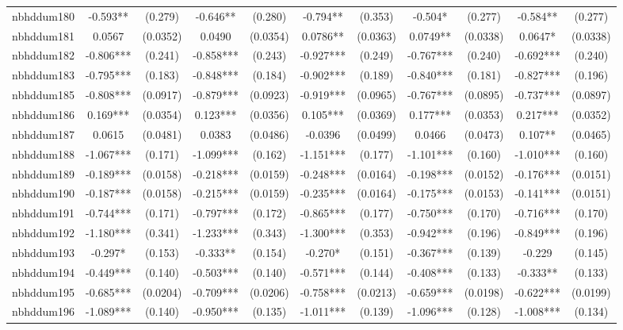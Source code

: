 \documentclass[]{article}
\begin{document}
\begin{tabular}{lcccccccccc}
nbhddum180 & -0.593** & (0.279) & -0.646** & (0.280) & -0.794** & (0.353) & -0.504* & (0.277) & -0.584** & (0.277) \\
nbhddum181 & 0.0567 & (0.0352) & 0.0490 & (0.0354) & 0.0786** & (0.0363) & 0.0749** & (0.0338) & 0.0647* & (0.0338) \\
nbhddum182 & -0.806*** & (0.241) & -0.858*** & (0.243) & -0.927*** & (0.249) & -0.767*** & (0.240) & -0.692*** & (0.240) \\
nbhddum183 & -0.795*** & (0.183) & -0.848*** & (0.184) & -0.902*** & (0.189) & -0.840*** & (0.181) & -0.827*** & (0.196) \\
nbhddum185 & -0.808*** & (0.0917) & -0.879*** & (0.0923) & -0.919*** & (0.0965) & -0.767*** & (0.0895) & -0.737*** & (0.0897) \\
nbhddum186 & 0.169*** & (0.0354) & 0.123*** & (0.0356) & 0.105*** & (0.0369) & 0.177*** & (0.0353) & 0.217*** & (0.0352) \\
nbhddum187 & 0.0615 & (0.0481) & 0.0383 & (0.0486) & -0.0396 & (0.0499) & 0.0466 & (0.0473) & 0.107** & (0.0465) \\
nbhddum188 & -1.067*** & (0.171) & -1.099*** & (0.162) & -1.151*** & (0.177) & -1.101*** & (0.160) & -1.010*** & (0.160) \\
nbhddum189 & -0.189*** & (0.0158) & -0.218*** & (0.0159) & -0.248*** & (0.0164) & -0.198*** & (0.0152) & -0.176*** & (0.0151) \\
nbhddum190 & -0.187*** & (0.0158) & -0.215*** & (0.0159) & -0.235*** & (0.0164) & -0.175*** & (0.0153) & -0.141*** & (0.0151) \\
nbhddum191 & -0.744*** & (0.171) & -0.797*** & (0.172) & -0.865*** & (0.177) & -0.750*** & (0.170) & -0.716*** & (0.170) \\
nbhddum192 & -1.180*** & (0.341) & -1.233*** & (0.343) & -1.300*** & (0.353) & -0.942*** & (0.196) & -0.849*** & (0.196) \\
nbhddum193 & -0.297* & (0.153) & -0.333** & (0.154) & -0.270* & (0.151) & -0.367*** & (0.139) & -0.229 & (0.145) \\
nbhddum194 & -0.449*** & (0.140) & -0.503*** & (0.140) & -0.571*** & (0.144) & -0.408*** & (0.133) & -0.333** & (0.133) \\
nbhddum195 & -0.685*** & (0.0204) & -0.709*** & (0.0206) & -0.758*** & (0.0213) & -0.659*** & (0.0198) & -0.622*** & (0.0199) \\
nbhddum196 & -1.089*** & (0.140) & -0.950*** & (0.135) & -1.011*** & (0.139) & -1.096*** & (0.128) & -1.008*** & (0.134) \\

\end{tabular}
\end{document}
